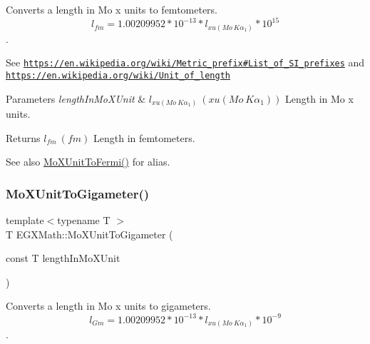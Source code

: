 Converts a length in Mo x units to femtometers. \[ l_{fm}=1.00209952*10^{-13} * l_{xu(Mo\ K\alpha_1)} * 10^{15} \]. 

See \href{https://en.wikipedia.org/wiki/Metric_prefix#List_of_SI_prefixes}{\tt https\+://en.\+wikipedia.\+org/wiki/\+Metric\+\_\+prefix\#\+List\+\_\+of\+\_\+\+S\+I\+\_\+prefixes} and \href{https://en.wikipedia.org/wiki/Unit_of_length}{\tt https\+://en.\+wikipedia.\+org/wiki/\+Unit\+\_\+of\+\_\+length} 
\begin{DoxyParams}{Parameters}
{\em length\+In\+Mo\+X\+Unit} & $ l_{xu(Mo\ K\alpha_1)}\ (xu(Mo\ K\alpha_1))$ Length in Mo x units. \\
\hline
\end{DoxyParams}
\begin{DoxyReturn}{Returns}
$ l_{fm}\ (fm)$ Length in femtometers. 
\end{DoxyReturn}
\begin{DoxySeeAlso}{See also}
\mbox{\hyperlink{group___e_g_x_math-_conversions-_length_conversions-_non-_s_i-_mo_x_unit-_non-_s_i_gac8cb731cb2dd7df67818cade6f80c011}{Mo\+X\+Unit\+To\+Fermi()}} for alias. 
\end{DoxySeeAlso}
\mbox{\label{group___e_g_x_math-_conversions-_length_conversions-_non-_s_i-_mo_x_unit-_s_i_gacb9954e25799b5b7963fd492ceae5363}} 
\subsubsection{\texorpdfstring{Mo\+X\+Unit\+To\+Gigameter()}{MoXUnitToGigameter()}}
{\footnotesize\ttfamily template$<$typename T $>$ \\
T E\+G\+X\+Math\+::\+Mo\+X\+Unit\+To\+Gigameter (\begin{DoxyParamCaption}\item[{const T}]{length\+In\+Mo\+X\+Unit }\end{DoxyParamCaption})}



Converts a length in Mo x units to gigameters. \[ l_{Gm}=1.00209952*10^{-13} * l_{xu(Mo\ K\alpha_1)} * 10^{-9} \]. 

